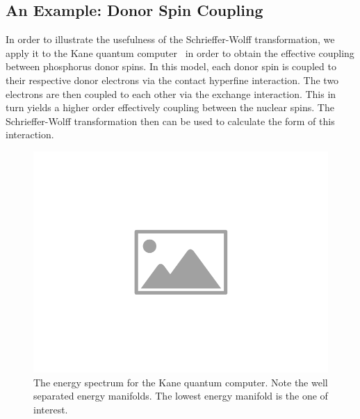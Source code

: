 \subsection{An Example: Donor Spin Coupling}

In order to illustrate the usefulness of the Schrieffer-Wolff transformation, we apply it to the Kane quantum computer~\cite{kane_1998} in order to obtain the effective coupling between phosphorus donor spins.
In this model, each donor spin is coupled to their respective donor electrons via the contact hyperfine interaction.
The two electrons are then coupled to each other via the exchange interaction.
This in turn yields a higher order effectively coupling between the nuclear spins.
The Schrieffer-Wolff transformation then can be used to calculate the form of this interaction.

\begin{figure}[htbp]
    \centering
    \includegraphics[width=0.75\columnwidth]{placeholder-image}
    \caption[Kane quantum computer energy spectrum.]{The energy spectrum for the Kane quantum computer. Note the well separated energy manifolds. The lowest energy manifold is the one of interest.}
    \label{FIG:kane_qc_spectrum}
\end{figure}

